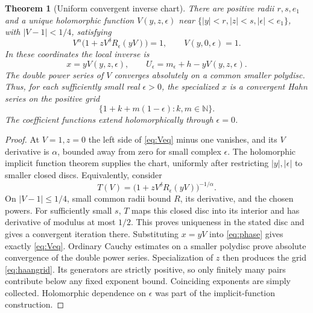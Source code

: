 \documentclass[11pt,a4paper]{article}
\numberwithin{equation}{section}
\newtheorem{theorem}{Theorem}[section]
\theoremstyle{definition}
\theoremstyle{remark}
\newcommand{\N}{\mathbb N}
\newcommand{\ee}{\epsilon}
\begin{document}
\begin{theorem}[Uniform convergent inverse chart]\label{thm:chart}
There are positive radii $r,s,e_1$ and a unique holomorphic function
$V(y,z,\ee)$ near $\{|y|<r,|z|<s,|\ee|<e_1\}$, with
$|V-1|<1/4$, satisfying
\begin{equation}\label{eq:Veq}
 V^\alpha\bigl(1+zV^\delta R_\ee(yV)\bigr)=1,
 \qquad V(y,0,\ee)=1.
\end{equation}
In these coordinates the local inverse is
\begin{equation}\label{eq:chart}
 x=yV(y,z,\ee),\qquad
 U_\ee=m_\ee+h-yV(y,z,\ee).
\end{equation}
The double power series of $V$ converges absolutely on a common smaller
polydisc. Thus, for each sufficiently small real $\ee>0$, the specialized
$x$ is a convergent Hahn series on the positive grid
\begin{equation}\label{eq:haangrid}
 \{1+k+m(1-\ee):k,m\in\N\}.
\end{equation}
The coefficient functions extend holomorphically through $\ee=0$.
\end{theorem}
\begin{proof}
At $V=1,z=0$ the left side of \eqref{eq:Veq} minus one vanishes, and its
$V$ derivative is $\alpha$, bounded away from zero for small complex
$\ee$. The holomorphic implicit function theorem supplies the chart,
uniformly after restricting $|y|,|\ee|$ to smaller closed discs. Equivalently,
consider
\[
 T(V)=\bigl(1+zV^\delta R_\ee(yV)\bigr)^{-1/\alpha}.
\]
On $|V-1|\le1/4$, small common radii bound $R$, its derivative, and the
chosen powers. For sufficiently small $s$, $T$ maps this closed disc into
its interior and has derivative of modulus at most $1/2$. This proves
uniqueness in the stated disc and gives a convergent iteration there.
Substituting $x=yV$ into \eqref{eq:phase} gives exactly \eqref{eq:Veq}.
Ordinary Cauchy estimates on a smaller polydisc prove absolute convergence
of the double power series. Specialization of $z$ then produces the grid
\eqref{eq:haangrid}. Its generators are strictly positive, so only finitely
many pairs contribute below any fixed exponent bound. Coinciding
exponents are simply collected. Holomorphic dependence on $\ee$ was part
of the implicit-function construction.
\end{proof}
\end{document}
